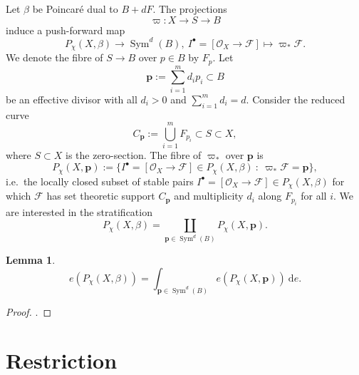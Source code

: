 \documentclass[12pt]{amsart}
\newtheorem{lemma}[theorem]{Lemma}
\theoremstyle{definition}
\theoremstyle{property}
\renewcommand\O{\mathcal O}
\newcommand\mdot{{\scriptscriptstyle\bullet}}
\newcommand\F{\mathcal F}
\newcommand\p{\mathbf{p}}
\newcommand\dd{\mathrm{d}}
\renewcommand\_{^{}_}
\newcommand\Sym{\operatorname{Sym}}
\begin{document}
Let $\beta$ be Poincar\'e dual to $B+dF$. The projections
\[
\varpi : X \longrightarrow S \longrightarrow B
\]
induce a push-forward map
\[
P_\chi(X,\beta) \longrightarrow \Sym^d(B), \ I^\mdot = [\O_X \rightarrow \F] \mapsto \varpi_* \F.
\]
We denote the fibre of $S \rightarrow B$ over $p \in B$ by $F_p$. Let
$$
\p := \sum_{i=1}^m d_i p_i  \subset B
$$
be an effective divisor with all $d_i > 0$ and $\sum_{i=1}^{m} d_i = d$. Consider the reduced curve
$$
C_{\p} := \bigcup_{i=1}^m F_{p_i} \subset S \subset X,
$$
where $S \subset X$ is the zero-section. The fibre of $\varpi_*$ over $\p$ is
$$
P_\chi(X, \p) := \big\{ I^\mdot = [\O_X \rightarrow \F] \in P_\chi(X,\beta) \ : \ \varpi_* \F = \p \big\},
$$
i.e.~the locally closed subset of stable pairs $I^\mdot = [\O_X \rightarrow \F] \in P_\chi(X,\beta)$ for which $\F$ has set theoretic support $C_{\p}$ and multiplicity $d_i$ along $F_{p_i}$ for all $i$. We are interested in the stratification
\[
P_\chi(X,\beta) = \coprod_{\p \in \Sym^d(B)} P_\chi(X,\p).
\]
\begin{lemma} \label{lem1}
\[
e(P_\chi(X,\beta)) = \int_{\p \in \Sym^d(B)} e(P_\chi(X,\p)) \ \dd e.
\]
\end{lemma}
\begin{proof}
\cite{MacP}.
\end{proof}


\section{Restriction} \label{secres}
\end{document}
